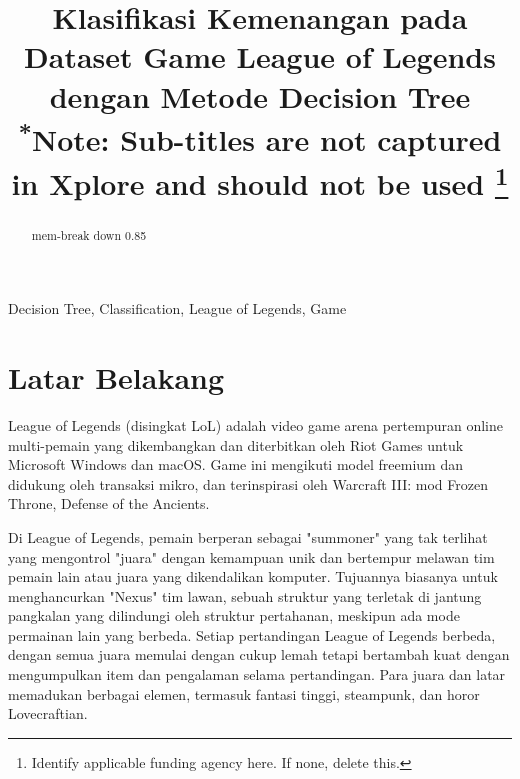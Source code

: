 \documentclass[conference]{IEEEtran}
\begin{document}
\title{Klasifikasi Kemenangan pada Dataset Game League of Legends dengan Metode Decision Tree\\
{\footnotesize \textsuperscript{*}Note: Sub-titles are not captured in Xplore and
should not be used}
\thanks{Identify applicable funding agency here. If none, delete this.}
}

\author{
\and
{}
}

\maketitle

\begin{abstract}
mem-break down 0.85
\end{abstract}

\begin{IEEEkeywords}
Decision Tree, Classification, League of Legends, Game
\end{IEEEkeywords}

\section{Latar Belakang}
League of Legends (disingkat LoL) adalah video game arena pertempuran online multi-pemain yang dikembangkan dan diterbitkan oleh Riot Games untuk Microsoft Windows dan macOS.  Game ini mengikuti model freemium dan didukung oleh transaksi mikro, dan terinspirasi oleh Warcraft III: mod Frozen Throne, Defense of the Ancients. 

Di League of Legends, pemain berperan sebagai "summoner" yang tak terlihat yang mengontrol "juara" dengan kemampuan unik dan bertempur melawan tim pemain lain atau juara yang dikendalikan komputer.  Tujuannya biasanya untuk menghancurkan "Nexus" tim lawan, sebuah struktur yang terletak di jantung pangkalan yang dilindungi oleh struktur pertahanan, meskipun ada mode permainan lain yang berbeda.  Setiap pertandingan League of Legends berbeda, dengan semua juara memulai dengan cukup lemah tetapi bertambah kuat dengan mengumpulkan item dan pengalaman selama pertandingan. Para juara dan latar memadukan berbagai elemen, termasuk fantasi tinggi, steampunk, dan horor Lovecraftian.
\end{document}
